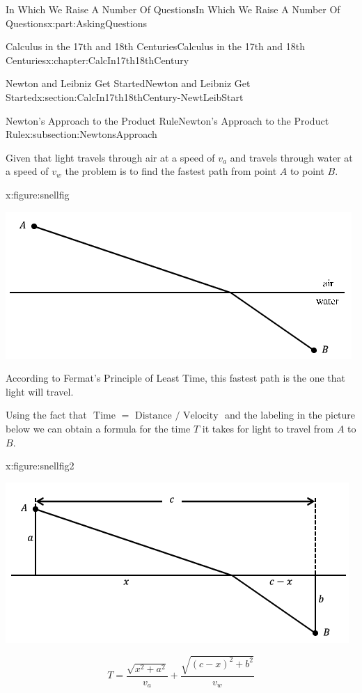 \documentclass[oneside,10pt,]{book}
\numberwithin{equation}{section}
\begin{document}
\begin{partptx}{In Which We Raise A Number Of Questions}{}{In Which We Raise A Number Of Questions}{}{}{x:part:AskingQuestions}
\begin{chapterptx}{Calculus in the 17th and 18th Centuries}{}{Calculus in the 17th and 18th Centuries}{}{}{x:chapter:CalcIn17th18thCentury}
\begin{sectionptx}{Newton and Leibniz Get Started}{}{Newton and Leibniz Get Started}{}{}{x:section:CalcIn17th18thCentury-NewtLeibStart}
\begin{subsectionptx}{Newton's Approach to the Product Rule}{}{Newton's Approach to the Product Rule}{}{}{x:subsection:NewtonsApproach}
\par
Given that light travels through air at a speed of \(v_a\) and travels through water at a speed of \(v_w\) the problem is to find the fastest path from point \(A\) to point \(B\).%
\begin{figureptx}{}{x:figure:snellfig}{}%
\begin{image}{0.125}{0.75}{0.125}%
\includegraphics[width=\linewidth]{images/snellfig.png}
\end{image}%
\tcblower
\end{figureptx}%
According to Fermat's Principle of Least Time, this fastest path is the one that light will travel.%
\par
Using the fact that \(\text{ Time } =\text{ Distance }
/\text{ Velocity }\) and the labeling in the picture below we can obtain a formula for the time \(T\) it takes for light to travel from \(A\) to \(B\).%
\begin{figureptx}{}{x:figure:snellfig2}{}%
\begin{image}{0.125}{0.75}{0.125}%
\includegraphics[width=\linewidth]{images/snellfig2.png}
\end{image}%
\tcblower
\end{figureptx}%
%
\begin{equation*}
T=\frac{\sqrt{x^2+a^2}}{v_a}+\frac{\sqrt{(c-x)^2+b^2}}{v_w}
\end{equation*}
%
\par

\end{subsectionptx}
\end{sectionptx}
\end{chapterptx}
\end{partptx}
\end{document}
